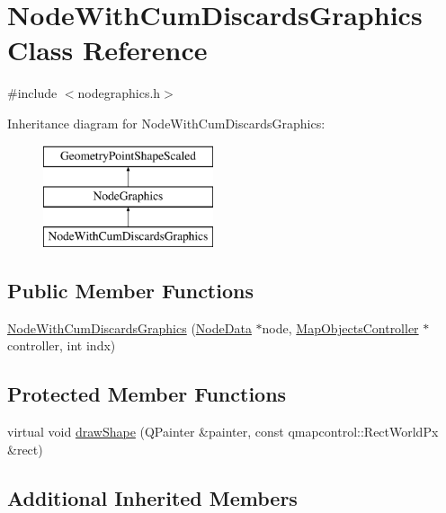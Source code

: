\hypertarget{class_node_with_cum_discards_graphics}{}\section{Node\+With\+Cum\+Discards\+Graphics Class Reference}
\label{class_node_with_cum_discards_graphics}


{\ttfamily \#include $<$nodegraphics.\+h$>$}

Inheritance diagram for Node\+With\+Cum\+Discards\+Graphics\+:\begin{figure}[H]
\begin{center}
\leavevmode
\includegraphics[height=3.000000cm]{d1/daa/class_node_with_cum_discards_graphics}
\end{center}
\end{figure}
\subsection*{Public Member Functions}
\begin{DoxyCompactItemize}
\item 
\mbox{\hyperlink{class_node_with_cum_discards_graphics_a027b865d59070d0a522db59212017d84}{Node\+With\+Cum\+Discards\+Graphics}} (\mbox{\hyperlink{class_node_data}{Node\+Data}} $\ast$node, \mbox{\hyperlink{class_map_objects_controller}{Map\+Objects\+Controller}} $\ast$controller, int indx)
\end{DoxyCompactItemize}
\subsection*{Protected Member Functions}
\begin{DoxyCompactItemize}
\item 
virtual void \mbox{\hyperlink{class_node_with_cum_discards_graphics_a34470db668ac4cbf19d4c08fb6f222cb}{draw\+Shape}} (Q\+Painter \&painter, const qmapcontrol\+::\+Rect\+World\+Px \&rect)
\end{DoxyCompactItemize}
\subsection*{Additional Inherited Members}


